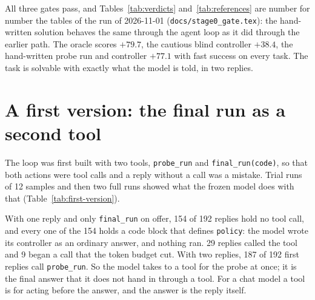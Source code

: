 \documentclass[11pt,a4paper]{article}
\begin{document}
\begin{table}[h]
\centering\small
\resizebox{\linewidth}{!}{}
\caption{Stage~0 on the agent loop: the three gates.}
\label{tab:verdicts}
\end{table}

\begin{table}[h]
\centering\small

\caption{The references on the 48 held-out tasks, by third of the limit's
range. The model runs below are read against these.}
\label{tab:references}
\end{table}

All three gates pass, and Tables~\ref{tab:verdicts} and~\ref{tab:references}
are number for number the tables of the run of 2026-11-01
(\texttt{docs/stage0\_gate.tex}): the hand-written solution behaves the same
through the agent loop as it did through the earlier path. The oracle scores
$+79.7$, the cautious blind controller $+38.4$, the hand-written probe run
and controller $+77.1$ with fast success on every task. The task is solvable
with exactly what the model is told, in two replies.

\section{A first version: the final run as a second tool}
\label{sec:first}

The loop was first built with two tools, \texttt{probe\_run} and
\texttt{final\_run(code)}, so that both actions were tool calls and a reply
without a call was a mistake. Trial runs of 12 samples and then two full
runs showed what the frozen model does with that
(Table~\ref{tab:first-version}).

\begin{table}[h]
\centering\small

\caption{The first version of the loop, in which the final run was a tool:
what the first reply of each sample is. \texttt{stage1-first} has one reply
and only the tool \texttt{final\_run}; \texttt{stage2-first} has two replies
and both tools.}
\label{tab:first-version}
\end{table}

With one reply and only \texttt{final\_run} on offer, 154 of 192 replies
hold no tool call, and every one of the 154 holds a code block that defines
\texttt{policy}: the model wrote its controller as an ordinary answer, and
nothing ran. 29 replies called the tool and 9 began a call that the token
budget cut. With two replies, 187 of 192 first replies call
\texttt{probe\_run}. So the model takes to a tool for the probe at once; it
is the final answer that it does not hand in through a tool. For a chat
model a tool is for acting before the answer, and the answer is the reply
itself.
\end{document}
